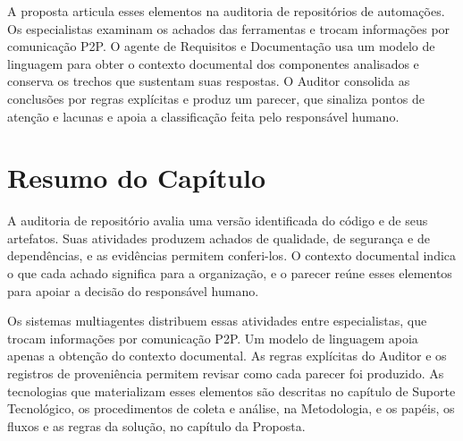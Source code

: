 A proposta articula esses elementos na auditoria de repositórios de automações. Os especialistas examinam os achados das ferramentas e trocam informações por comunicação P2P. O agente de Requisitos e Documentação usa um modelo de linguagem para obter o contexto documental dos componentes analisados e conserva os trechos que sustentam suas respostas. O Auditor consolida as conclusões por regras explícitas e produz um parecer, que sinaliza pontos de atenção e lacunas e apoia a classificação feita pelo responsável humano.

\section{Resumo do Capítulo}
\label{rt-resumo}

A auditoria de repositório avalia uma versão identificada do código e de seus artefatos. Suas atividades produzem achados de qualidade, de segurança e de dependências, e as evidências permitem conferi-los. O contexto documental indica o que cada achado significa para a organização, e o parecer reúne esses elementos para apoiar a decisão do responsável humano.

Os sistemas multiagentes distribuem essas atividades entre especialistas, que trocam informações por comunicação P2P. Um modelo de linguagem apoia apenas a obtenção do contexto documental. As regras explícitas do Auditor e os registros de proveniência permitem revisar como cada parecer foi produzido. As tecnologias que materializam esses elementos são descritas no capítulo de Suporte Tecnológico, os procedimentos de coleta e análise, na Metodologia, e os papéis, os fluxos e as regras da solução, no capítulo da Proposta.
